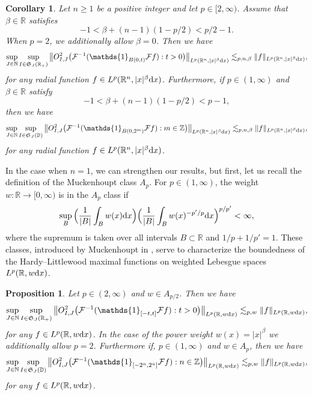 \documentclass[11pt,oneside]{amsart}
\numberwithin{equation}{section}
\newtheorem{corollary}[equation]{Corollary}
\newtheorem{proposition}[equation]{Proposition}
\theoremstyle{definition}
\newcommand{\DD}{\mathbb{D}}
\newcommand{\NN}{\mathbb{N}}
\newcommand{\RR}{\mathbb{R}}
\newcommand{\ZZ}{\mathbb{Z}}
\newcommand{\calF}{\mathcal{F}}
\begin{document}
\begin{corollary}
Let $n\geq1$ be a positive integer and let $p\in[2,\infty)$. Assume that $\beta\in\RR$ satisfies
\begin{equation*}
    -1<\beta+(n-1)(1-p/2)<p/2-1.
\end{equation*}
When $p=2$, we additionally allow $\beta=0$. Then we have
\begin{equation*}
    \sup_{J\in\NN}\sup_{I\in\mathfrak{S}_J(\RR_+) }\big\|O_{I,J}^2\big(\calF^{-1}(\mathds{1}_{B(0,t)}\calF f):t>0\big)\big\|_{L^p(\RR^n,|x|^{\beta}{\rm d}x)}\lesssim_{p,n,\beta}\|f\|_{L^p(\RR^n,|x|^{\beta}{\rm d}x)},
\end{equation*}
for any radial function $f\in L^p(\RR^n,|x|^{\beta}{\rm d}x)$. Furthermore, if $p\in(1,\infty)$ and $\beta\in\RR$ satisfy
\begin{equation*}
    -1<\beta+(n-1)(1-p/2)<p-1,
\end{equation*}
then we have
\begin{equation*}
    \sup_{J\in\NN}\sup_{I\in\mathfrak{S}_J(\DD) }\big\|O_{I,J}^2\big(\calF^{-1}(\mathds{1}_{B(0,2^m)}\calF f):m\in\ZZ\big)\big\|_{L^p(\RR^n,|x|^{\beta}{\rm d}x)}\lesssim_{p,n,\beta}\|f\|_{L^p(\RR^n,|x|^{\beta}{\rm d}x)},
\end{equation*}
for any radial function $f\in L^p(\RR^n,|x|^{\beta}{\rm d}x)$.
\end{corollary}
In the case when $n = 1$, we can strengthen our results, but first, let us recall the definition of the Muckenhoupt class $A_p$. For $p\in(1,\infty)$, the weight $w\colon\RR\to[0,\infty)$ is in the $A_p$ class if
\begin{equation*}
    \sup_{B}\Big(\frac{1}{|B|}\int_B w(x){\rm d}x\Big)\Big(\frac{1}{|B|}\int_Bw(x)^{-p'/p}{\rm d}x\Big)^{p/p'}<\infty,
\end{equation*}
where the supremum is taken over all intervals $B\subset\RR$ and $1/p+1/p'=1$. These classes, introduced by Muckenhoupt in \cite{Mu1}, serve to characterize the boundedness of the Hardy--Littlewood maximal functions on weighted Lebesgue spaces $L^p(\RR,w{\rm d}x)$.
\begin{proposition}\label{prop:weight:carle}
Let $p\in(2,\infty)$ and $w\in A_{p/2}$. Then we have
\begin{equation*}
    \sup_{J\in\NN}\sup_{I\in\mathfrak{S}_J(\RR_+) }\big\|O_{I,J}^2\big(\calF^{-1}(\mathds{1}_{[-t,t]}\calF f):t>0\big)\big\|_{L^p(\RR,w{\rm d}x)}\lesssim_{p,w}\|f\|_{L^p(\RR,w{\rm d}x)},
\end{equation*}
for any $f\in L^p(\RR,w{\rm d}x) $. In the case of the power weight $w(x)=|x|^\beta$ we additionally allow $p=2$. Furthermore if, $p\in(1,\infty)$ and $w\in A_p$, then we have
\begin{equation*}
    \sup_{J\in\NN}\sup_{I\in\mathfrak{S}_J(\DD) }\big\|O_{I,J}^2\big(\calF^{-1}(\mathds{1}_{[-2^n,2^n]}\calF f):n\in\ZZ\big)\big\|_{L^p(\RR,w{\rm d}x)}\lesssim_{p,w}\|f\|_{L^p(\RR,w{\rm d}x)},
\end{equation*}
for any $f\in L^p(\RR,w{\rm d}x)$.
\end{proposition}
\end{document}
